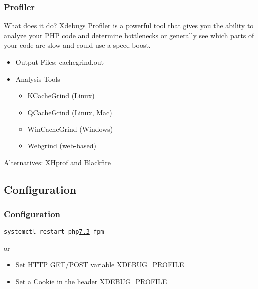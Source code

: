 \begin{frame}\frametitle{Profiler}
    \begin{block}{What does it do?}
    Xdebugs Profiler is a powerful tool that gives you the ability 
    to analyze your PHP code and determine bottlenecks or generally 
    see which parts of your code are slow and could use a speed boost.
    \end{block} \pause
    \begin{itemize}
        \item Output Files: cachegrind.out \pause
        \item Analysis Tools 
            \begin{itemize} 
            \item KCacheGrind (Linux)
            \item QCacheGrind (Linux, Mac)
            \item WinCacheGrind (Windows)
            \item Webgrind (web-based)
            \end{itemize}
    \end{itemize} \pause
    Alternatives: XHprof and \underline{Blackfire}
\end{frame}

\subsection{Configuration}
\begin{frame}\frametitle{Configuration}
    
    \texttt{systemctl restart php\underline{7.3}-fpm} \pause
    
    or
    \begin{itemize}
        \item Set HTTP GET/POST variable XDEBUG\_PROFILE
        \item Set a Cookie in the header XDEBUG\_PROFILE
    \end{itemize}
\end{frame}
